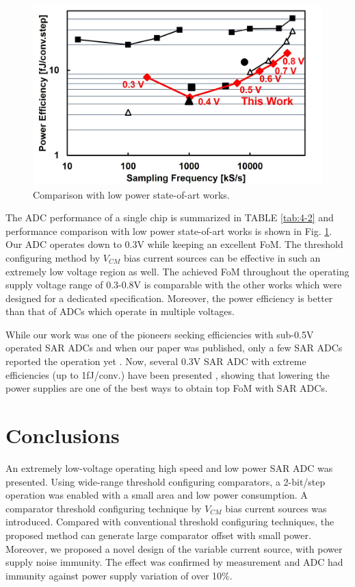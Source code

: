 \begin{figure}
\centering
  \includegraphics[width=1\textwidth]{figure/chap4/comparison.jpg}
  \caption{Comparison with low power state-of-art works.}
  \label{fig-4-18}
\end{figure}

The ADC performance of a single chip is summarized in TABLE \ref{tab:4-2} and performance comparison with low power state-of-art works is shown in Fig. \ref{fig-4-18}. Our ADC operates down to 0.3V while keeping an excellent FoM. The threshold configuring method by $V_{CM}$ bias current sources can be effective in such an extremely low voltage region as well. The achieved FoM throughout the operating supply voltage range of 0.3-0.8V is comparable with the other works which were designed for a dedicated specification. Moreover, the power efficiency is better than that of ADCs which operate in multiple voltages.

While our work was one of the pioneers seeking efficiencies with sub-0.5V operated SAR ADCs and when our paper was published, only a few SAR ADCs reported the operation yet \cite{tai20123}. Now, several 0.3V SAR ADC with extreme efficiencies (up to 1fJ/conv.) have been presented \cite{03VSAR} \cite{03VSAR2} \cite{03VSAR3}, showing that lowering the power supplies are one of the best ways to obtain top FoM with SAR ADCs.  

\section{Conclusions}

An extremely low-voltage operating high speed and low power SAR ADC was presented. Using wide-range threshold configuring comparators, a 2-bit/step operation was enabled with a small area and low power consumption. A comparator threshold configuring technique by $V_{CM}$ bias current sources was introduced. Compared with conventional threshold configuring techniques, the proposed method can generate large comparator offset with small power. Moreover, we proposed a novel design of the variable current source, with power supply noise immunity. The effect was confirmed by measurement and ADC had immunity against power supply variation of over 10\%. 

